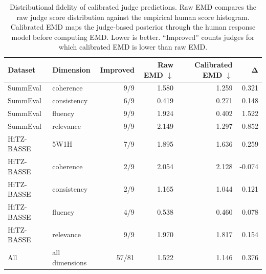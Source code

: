 \begin{table}[ht]
\centering
\small
\setlength{\tabcolsep}{4pt}
\caption{
Distributional fidelity of calibrated judge predictions.
Raw EMD compares the raw judge score distribution against the empirical
human score histogram. Calibrated EMD maps the judge-based posterior
through the human response model before computing EMD. Lower is better.
``Improved'' counts judges for which calibrated EMD is lower than raw EMD.
}
\label{tab:distributional-emd}
\begin{tabular}{llrrrr}
\toprule
\textbf{Dataset}
& \textbf{Dimension}
& \textbf{Improved}
& \textbf{Raw EMD $\downarrow$}
& \textbf{Calibrated EMD $\downarrow$}
& $\boldsymbol{\Delta}$ \\
\midrule
SummEval & coherence & 9/9 & 1.580 & 1.259 & 0.321 \\
SummEval & consistency & 6/9 & 0.419 & 0.271 & 0.148 \\
SummEval & fluency & 9/9 & 1.924 & 0.402 & 1.522 \\
SummEval & relevance & 9/9 & 2.149 & 1.297 & 0.852 \\
\midrule
HiTZ-BASSE & 5W1H & 7/9 & 1.895 & 1.636 & 0.259 \\
HiTZ-BASSE & coherence & 2/9 & 2.054 & 2.128 & -0.074 \\
HiTZ-BASSE & consistency & 2/9 & 1.165 & 1.044 & 0.121 \\
HiTZ-BASSE & fluency & 4/9 & 0.538 & 0.460 & 0.078 \\
HiTZ-BASSE & relevance & 9/9 & 1.970 & 1.817 & 0.154 \\
\midrule
All & all dimensions & 57/81 & 1.522 & 1.146 & 0.376 \\
\bottomrule
\end{tabular}
\end{table}
